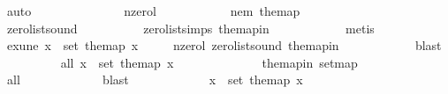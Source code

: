 \begin{isabellebody}
\ auto\isanewline
\ \ \ \ \isamarkupfalse%
\isanewline
\ \ \ \ \ \ \ \ \isamarkupfalse%
\ n{\isacharunderscore}{\kern0pt}zero{\isacharunderscore}{\kern0pt}l\isanewline
\ \ \ \ \ \ \ \ \isamarkupfalse%
\ \isamarkupfalse%
\ nem{\isacharcolon}{\kern0pt}\ {\isachardoublequoteopen}the{\isacharunderscore}{\kern0pt}map\isanewline
\ \ \ \ \ \ \ \ \ \ \ {\isasymnoteq}\ {\isacharbrackleft}{\kern0pt}{\isacharbrackright}{\kern0pt}{\isachardoublequoteclose}\ \isamarkupfalse%
\ zero{\isacharunderscore}{\kern0pt}list{\isacharunderscore}{\kern0pt}sound\isanewline
\ \ \ \ \ \ \ \ \ \ zero{\isacharunderscore}{\kern0pt}list{\isachardot}{\kern0pt}simps{\isacharparenleft}{\kern0pt}{}{\isacharparenright}{\kern0pt}\ the{\isacharunderscore}{\kern0pt}map{\isacharunderscore}{\kern0pt}in\isanewline
\ \ \ \ \ \ \ \ \ \ \isamarkupfalse%
\ metis\ \ \isanewline
\ \ \ \ \ \ \ \ \isamarkupfalse%
\ exune{\isacharcolon}{\kern0pt}\ {\isachardoublequoteopen}{\isasymexists}x\ {\isasymin}\ set\ the{\isacharunderscore}{\kern0pt}map{\isachardot}{\kern0pt}\ x\ \ {\isasymnoteq}\ {}{\isachardoublequoteclose}\ \isamarkupfalse%
\ n{\isacharunderscore}{\kern0pt}zero{\isacharunderscore}{\kern0pt}l\ zero{\isacharunderscore}{\kern0pt}list{\isacharunderscore}{\kern0pt}sound\ the{\isacharunderscore}{\kern0pt}map{\isacharunderscore}{\kern0pt}in\isanewline
\ \ \ \ \ \ \ \ \ \ \isamarkupfalse%
\ blast\isanewline
\ \ \ \ \ \ \ \ \isamarkupfalse%
\ all{}{}{\isacharunderscore}{\kern0pt}{}{\isacharcolon}{\kern0pt}\ {\isachardoublequoteopen}{\isasymforall}x\ {\isasymin}\ set\ the{\isacharunderscore}{\kern0pt}map{\isachardot}{\kern0pt}\ x\ {\isasymin}\ {\isacharbraceleft}{\kern0pt}{}{\isacharcomma}{\kern0pt}{}{\isacharbraceright}{\kern0pt}{\isachardoublequoteclose}\isanewline
\ \ \ \ \ \ \ \ \ \ \isamarkupfalse%
\ the{\isacharunderscore}{\kern0pt}map{\isacharunderscore}{\kern0pt}in\ set{\isacharunderscore}{\kern0pt}map\ \isanewline
\ \ \ \ \ \ \ \ \ \ \isamarkupfalse%
\ all{}{}\ \isanewline
\ \ \ \ \ \ \ \ \ \ \isamarkupfalse%
\ blast\ \isanewline
\ \ \ \ \ \ \ \ \isamarkupfalse%
\ \isamarkupfalse%
\ {\isachardoublequoteopen}{\isasymexists}x\ {\isasymin}\ set\ the{\isacharunderscore}{\kern0pt}map{\isachardot}{\kern0pt}\ x\ {\isacharequal}{\kern0pt}\ {}{\isachardoublequoteclose}\ \isamarkupfalse%

\end{isabellebody}
